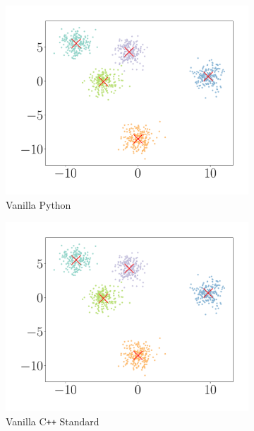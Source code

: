 \documentclass{article}
\begin{document}
\begin{figure}[H]
\begin{subfigure}[b]{0.32\linewidth}
    \end{subfigure}
    \begin{subfigure}[b]{0.32\linewidth}
      \centering
      \includegraphics[scale=0.25]{figures/vnlpy1K.pdf}
      \caption{\sc Vanilla Python}
    \end{subfigure}
    \begin{subfigure}[b]{0.32\linewidth}
      \centering
      \includegraphics[scale=0.25]{figures/vnlcc1K.pdf}
      \caption{\sc Vanilla C{\tt++} Standard}
    \end{subfigure}
    \begin{subfigure}[b]{0.32\linewidth}
      \centering

\end{subfigure}
\end{figure}
\end{document}

